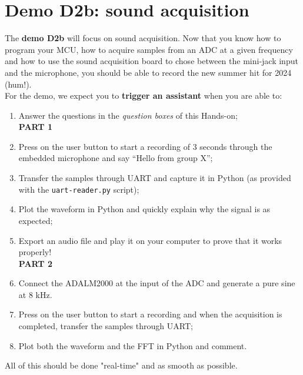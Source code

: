 \clearpage
\section{Demo D2b: sound acquisition}

The \textbf{demo D2b} will focus on sound acquisition. Now that you know how to program your MCU, how to acquire samples from an ADC at a given frequency and how to use the sound acquisition board to chose between the mini-jack input and the microphone, you should be able to record the new summer hit for 2024 (hum!). \\

\noindent For the demo, we expect you to \textbf{trigger an assistant} when you are able to:

\begin{enumerate}
    \item Answer the questions in the \textit{question boxes} \bcquestion of this Hands-on; \\

    \textbf{PART 1}
    \item Press on the user button to start a recording of 3 seconds through the embedded microphone and say “Hello from group X”;
    \item Transfer the samples through UART and capture it in Python (as provided with the \texttt{uart-reader.py} script);
    \item Plot the waveform in Python and quickly explain why the signal is as expected;
    \item Export an audio file and play it on your computer to prove that it works properly! \\

    \textbf{PART 2}
    \item Connect the ADALM2000 at the input of the ADC and generate a pure sine at 8 kHz.
    \item Press on the user button to start a recording and when the acquisition is completed, transfer the samples through UART;
    \item Plot both the waveform and the FFT in Python and comment.
\end{enumerate}

\vspace{0.3cm}
\noindent All of this should be done "real-time" and as smooth as possible.

